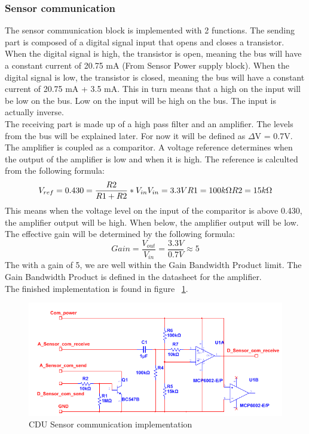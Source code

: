 \subsubsection{Sensor communication}
The sensor communication block is implemented with 2 functions. The sending part is composed of a digital signal input that opens and closes a transistor. When the digital signal is high, the transistor is open, meaning the bus will have a constant current of 20.75 mA (From Sensor Power supply block). When the digital signal is low, the transistor is closed, meaning the bus will have a constant current of 20.75 mA + 3.5 mA. This in turn means that a high on the input will be low on the bus. Low on the input will be high on the bus. The input is actually inverse.\\
The receiving part is made up of a high pass filter and an amplifier. The levels from the bus will be explained later. For now it will be defined as $\Delta$V = 0.7V. The amplifier is coupled as a comparitor. A voltage reference determines when the output of the amplifier is low and when it is high. The reference is calculted from the following formula:
\begin{equation}
	V_{ref} = 0.430 = \frac{R2}{R1+R2} * V_{in} $\\$
	V_{in} = 3.3V $\\$
	R1 = 100k\Omega $\\$
	R2 = 15k\Omega
\end{equation}
This means when the voltage level on the input of the comparitor is above 0.430, the amplifier output will be high. When below, the amplifier output will be low. The effective gain will be determined by the following formula:
\begin{equation}
	Gain = \frac{V_{out}}{V_{in}} = \frac{3.3V}{0.7V} \approx 5 
\end{equation}
The with a gain of 5, we are well within the Gain Bandwidth Product limit. The Gain Bandwidth Product is defined in the datasheet for the amplifier.\\
The finished implementation is found in figure ~\ref{fig:CDUimpsc}.
\begin{figure}[H]
	\centering
	\includegraphics[width=1\textwidth]{billeder/impsc}
	\caption{CDU Sensor communication implementation}
	\label{fig:CDUimpsc}
\end{figure}



